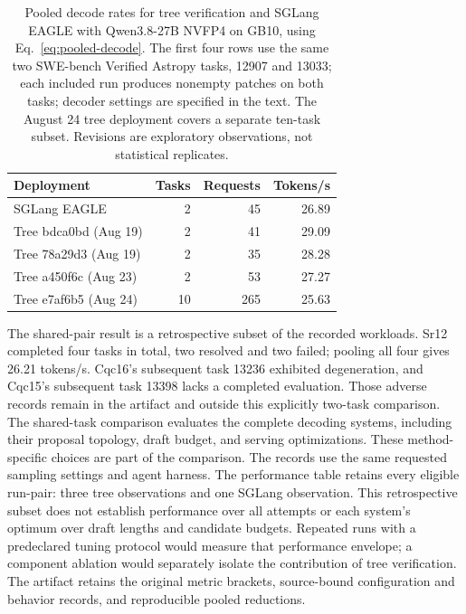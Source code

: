 \begin{table}[t]
\caption{Pooled decode rates for tree verification and SGLang EAGLE with Qwen3.8-27B NVFP4 on GB10, using Eq.~\ref{eq:pooled-decode}. The first four rows use the same two SWE-bench Verified Astropy tasks, 12907 and 13033; each included run produces nonempty patches on both tasks; decoder settings are specified in the text. The August 24 tree deployment covers a separate ten-task subset. Revisions are exploratory observations, not statistical replicates.}
\label{tab:pooled-decode}
\centering\small
\begin{tabular}{@{}lrrr@{}}
\toprule
Deployment & Tasks & Requests & Tokens/s \\
\midrule
SGLang EAGLE & 2 & 45 & 26.89 \\
Tree bdca0bd (Aug 19) & 2 & 41 & 29.09 \\
Tree 78a29d3 (Aug 19) & 2 & 35 & 28.28 \\
Tree a450f6c (Aug 23) & 2 & 53 & 27.27 \\
\midrule
Tree e7af6b5 (Aug 24) & 10 & 265 & 25.63 \\
\bottomrule
\end{tabular}
\end{table}

The shared-pair result is a retrospective subset of the recorded workloads. Sr12 completed four tasks in total, two resolved and two failed; pooling all four gives 26.21 tokens/s. Cqc16's subsequent task 13236 exhibited degeneration, and Cqc15's subsequent task 13398 lacks a completed evaluation. Those adverse records remain in the artifact and outside this explicitly two-task comparison. The shared-task comparison evaluates the complete decoding systems, including their proposal topology, draft budget, and serving optimizations. These method-specific choices are part of the comparison. The records use the same requested sampling settings and agent harness. The performance table retains every eligible run-pair: three tree observations and one SGLang observation. This retrospective subset does not establish performance over all attempts or each system's optimum over draft lengths and candidate budgets. Repeated runs with a predeclared tuning protocol would measure that performance envelope; a component ablation would separately isolate the contribution of tree verification. The artifact retains the original metric brackets, source-bound configuration and behavior records, and reproducible pooled reductions.



